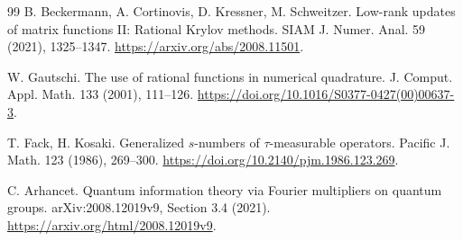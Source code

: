 \documentclass[11pt]{article}
\numberwithin{equation}{section}
\begin{document}
\begin{thebibliography}{99}
B. Beckermann, A. Cortinovis, D. Kressner, M. Schweitzer.
Low-rank updates of matrix functions II: Rational Krylov methods.
SIAM J. Numer. Anal. 59 (2021), 1325--1347.
\url{https://arxiv.org/abs/2008.11501}.

W. Gautschi. The use of rational functions in numerical quadrature.
J. Comput. Appl. Math. 133 (2001), 111--126.
\url{https://doi.org/10.1016/S0377-0427(00)00637-3}.

T. Fack, H. Kosaki. Generalized $s$-numbers of $\tau$-measurable operators.
Pacific J. Math. 123 (1986), 269--300.
\url{https://doi.org/10.2140/pjm.1986.123.269}.

C. Arhancet. Quantum information theory via Fourier multipliers on
quantum groups. arXiv:2008.12019v9, Section 3.4 (2021).
\url{https://arxiv.org/html/2008.12019v9}.
\end{thebibliography}
\end{document}
